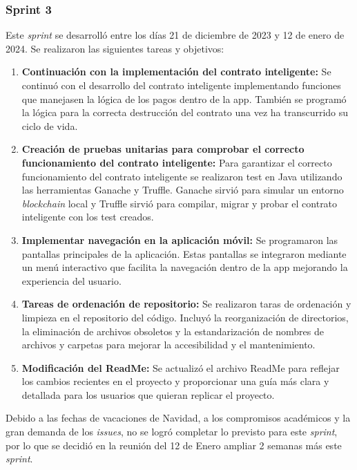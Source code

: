 \subsubsection{Sprint 3}

Este \textit{sprint} se desarrolló entre los días 21 de diciembre de 2023 y 12 de enero de 2024. Se realizaron las siguientes tareas y objetivos:

\begin{enumerate}

\item \textbf{Continuación con la implementación del contrato inteligente:} Se continuó con el desarrollo del contrato inteligente implementando funciones que manejasen la lógica de los pagos dentro de la app. También se programó la lógica para la correcta destrucción del contrato una vez ha transcurrido su ciclo de vida.

\item \textbf{Creación de pruebas unitarias para comprobar el correcto funcionamiento del contrato inteligente:}  Para garantizar el correcto funcionamiento del contrato inteligente se realizaron test en Java utilizando las herramientas Ganache y Truffle.
Ganache sirvió para simular un entorno \textit{blockchain} local y Truffle sirvió para compilar, migrar y probar el contrato inteligente con los test creados.

\item \textbf{Implementar navegación en la aplicación móvil:} Se programaron las pantallas principales de la aplicación. Estas pantallas se integraron mediante un menú interactivo que facilita la navegación dentro de la app mejorando la experiencia del usuario.

\item \textbf{Tareas de ordenación de repositorio:} Se realizaron taras de ordenación y limpieza en el repositorio del código. Incluyó la reorganización de directorios, la eliminación de archivos obsoletos y la estandarización de nombres de archivos y carpetas para mejorar la accesibilidad y el mantenimiento.

\item \textbf{Modificación del ReadMe:} Se actualizó el archivo ReadMe para reflejar los cambios recientes en el proyecto y proporcionar una guía más clara y detallada para los usuarios que quieran replicar el proyecto.

\end{enumerate}

Debido a las fechas de vacaciones de Navidad, a los compromisos académicos y la gran demanda de los \textit{issues}, no se logró completar lo previsto para este \textit{sprint}, por lo que se decidió en la reunión del 12 de Enero ampliar 2 semanas más este \textit{sprint}.


